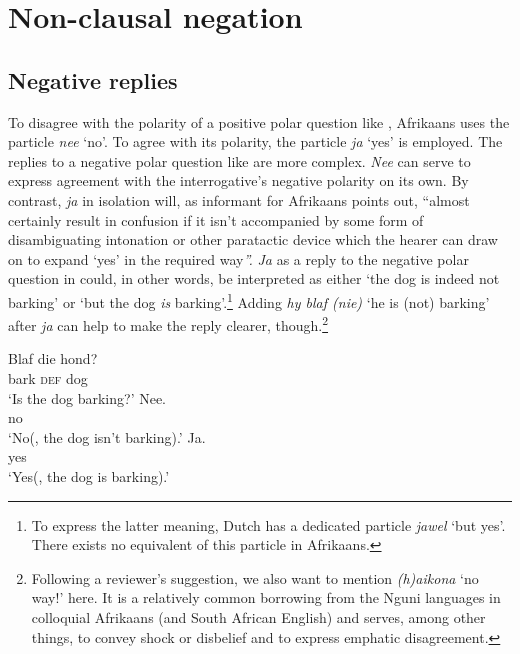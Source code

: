 \documentclass[output=paper,colorlinks,citecolor=brown]{langscibook}
\begin{document}
\section{Non-clausal negation}

\subsection{Negative replies}

To disagree with the polarity of a positive polar question like , Afrikaans uses the particle \textit{nee} ‘no’. To agree with its polarity, the particle \textit{ja} ‘yes’ is employed. The replies to a negative polar question like  are more complex. \textit{Nee} can serve to express agreement with the interrogative’s negative polarity on its own. By contrast, \textit{ja} in isolation will, as  informant for Afrikaans points out, “almost certainly result in confusion if it isn’t accompanied by some form of disambiguating intonation or other paratactic device which the hearer can draw on to expand ‘yes’ in the required way\textit{”.} \textit{Ja} as a reply to the negative polar question in  could, in other words, be interpreted as either ‘the dog is indeed not barking’ or ‘but the dog \textit{is} barking’.\footnote{To express the latter meaning, Dutch has a dedicated particle \textit{jawel} ‘but yes’. There exists no equivalent of this particle in Afrikaans.} Adding \textit{hy blaf (nie)} ‘he is (not) barking’ after \textit{ja} can help to make the reply clearer, though.\footnote{Following a reviewer’s suggestion, we also want to mention \textit{(h)aikona} ‘no way!’ here. It is a relatively common borrowing from the Nguni languages in colloquial Afrikaans (and South African English) and serves, among other things, to convey shock or disbelief and to express emphatic disagreement.}

\ea\label{ex:afr:24}
    \begin{xlist}[A2:]
    \label{ex:afr:24a}
        \gll Blaf die hond?  \\ 
             bark \textsc{def} dog \\ 
        \glt ‘Is the dog barking?’    
    \label{ex:afr:24b}
        \gll Nee. \\ 
             no  \\
        \glt ‘No(, the dog isn’t barking).’ 
    \label{ex:afr:24c}
        \gll  Ja. \\ 
              yes \\
        \glt  ‘Yes(, the dog is barking).’
    \end{xlist}
\z 
\end{document}
